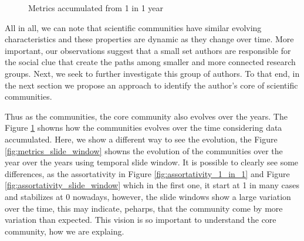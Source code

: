 \begin{figure}[!htb]
\begin{center}
{  }%

  \end{center}
  \caption{Metrics accumulated from 1 in 1 year}
  \label{fig:metrics_accumulated_1_in_1}
\end{figure}

All in all, we can note that scientific communities have similar evolving characteristics and these properties are dynamic as they change over time.  More important, our
observations suggest that a small set authors are responsible for the social clue that create the paths among smaller and more connected research groups. Next, we seek to further
investigate this group of authors. To that end, in the next section we propose an approach to identify the author's core of scientific communities.

Thus as the communities, the core community also evolves over the years. The Figure \ref{fig:metrics_accumulated_1_in_1}
showns how the communities evolves over the time considering data accumulated. Here, we show a different way to see the evolution,
the Figure \ref{fig:metrics_slide_window} showns the evolution of the communities over the year over the years using temporal slide 
window. It is possible to clearly see some differences, as the assortativity in Figure \ref{fig:assortativity_1_in_1}
and Figure \ref{fig:assortativity_slide_window} which in the first one, it start at 1 in many cases and stabilizes at 0 
nowadays, however, the slide windows show a large variation over the time, this may indicate, peharps, that the community come by
more variation than expected. This vision is so important to understand the core community, how we are explaing.\\
\fi 

